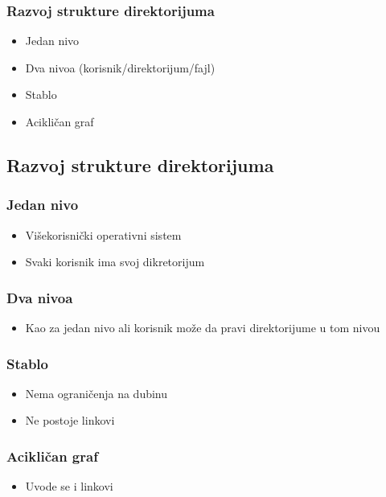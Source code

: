 \documentclass{beamer}
\begin{document}
\begin{frame}
    \frametitle{Razvoj strukture direktorijuma}
    \begin{itemize}
        \item Jedan nivo \newline
        \item Dva nivoa (korisnik/direktorijum/fajl) \newline
        \item Stablo \newline
        \item Acikličan graf
    \end{itemize}
\end{frame}

\subsection*{Razvoj strukture direktorijuma}
\begin{frame}
    \frametitle{Jedan nivo}
    \begin{itemize}
        \item Višekorisnički operativni sistem \newline
        \item Svaki korisnik ima svoj dikretorijum 
    \end{itemize}
\end{frame}

\begin{frame}
    \frametitle{Dva nivoa}
    \begin{itemize}
        \item Kao za jedan nivo ali korisnik može da pravi direktorijume u tom nivou
    \end{itemize}

\end{frame}

\begin{frame}
    \frametitle{Stablo}
    \begin{itemize}
        \item Nema ograničenja na dubinu \newline
        \item Ne postoje linkovi
    \end{itemize}
\end{frame}

\begin{frame}
    \frametitle{Acikličan graf}
    \begin{itemize}
        \item Uvode se i linkovi
    \end{itemize}

\end{frame}
\end{document}
